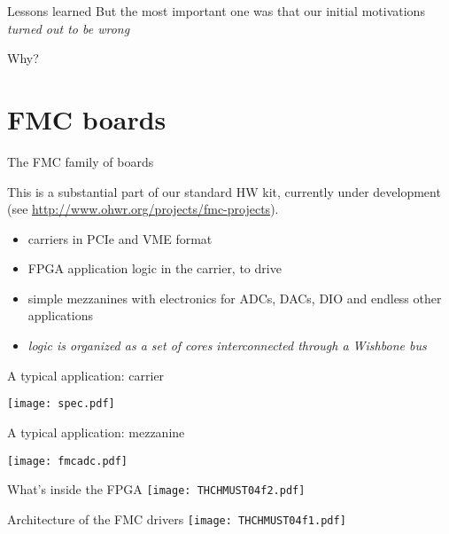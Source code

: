 \documentclass{beamer}
\begin{document}
\begin{frame}{Lessons learned}
But the most important one was that our initial motivations
\emph{turned out to be wrong}

\begin{center}
\Huge Why?
\end{center}
\end{frame}

\section{FMC boards}

\begin{frame}{The FMC family of boards}

This is a substantial part of our standard HW kit, currently under
development\\
(see \url{http://www.ohwr.org/projects/fmc-projects}).

\begin{itemize}
\item carriers in PCIe and VME format
\item FPGA application logic in the carrier, to drive
\item simple mezzanines with electronics for ADCs, DACs, DIO and endless
    other applications
\item \emph{logic is organized as a set of cores interconnected through a
    Wishbone bus}
\end{itemize}
\end{frame}

\begin{frame}{A typical application: carrier}
\begin{center}
\texttt{[image: spec.pdf]}
\end{center}
\end{frame}

\begin{frame}{A typical application: mezzanine}
\begin{center}
\texttt{[image: fmcadc.pdf]}
\end{center}
\end{frame}

\begin{frame}{What's inside the FPGA}
\texttt{[image: THCHMUST04f2.pdf]}
\end{frame}

\begin{frame}{Architecture of the FMC drivers}
\texttt{[image: THCHMUST04f1.pdf]}
\end{frame}
\end{document}
